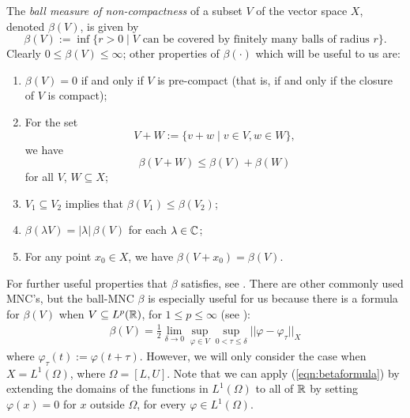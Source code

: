 \begin{definition} \label{th:betadef}
	The \emph{ball measure of non-compactness} of a subset $V$ of the vector space $X$, denoted $\beta(V)$, is given by
	\[\beta(V):= \inf\{ r>0 \mid V \text{ can be covered by finitely many balls of radius } r \}.\]
	Clearly $0 \leq \beta(V) \leq \infty$; other properties of $\beta(\cdot)$ which will be useful to us are:
	\begin{enumerate}
		\item $\beta(V) = 0$ if and only if $V$ is pre-compact (that is, if and only if the closure of $V$ is compact);
		\item For the set
		\[V + W := \{v + w \mid v \in V, w \in W\},\]
		we have
		\[\beta(V+W) \leq \beta(V) + \beta(W)\]
		for all $V$, $W \subseteq X$;
		\item $V_1 \subseteq V_2$ implies that $\beta(V_1) \leq \beta(V_2)$;
		\item $\beta(\lambda V) = |\lambda| \, \beta(V)$ for each $\lambda \in \mathbb{C}$;
		\item For any point $x_0 \in X$, we have $\beta(V+x_0) = \beta(V)$.
	\end{enumerate}
\end{definition}
For further useful properties that $\beta$ satisfies, see \cite{Akhmerov1992}. There are other commonly used MNC's, but the ball-MNC $\beta$ is especially useful for us because there is a formula for $\beta(V)$ when $V \subseteq L^p(\mathbb{R})$, for $1 \leq p \leq \infty$ (see \cite{Akhmerov1992}):
\begin{align}
	\beta(V) = \frac 12 \lim_{\delta \to 0} \sup_{\varphi \in V} \sup_{0<\tau \leq \delta} ||\varphi - \varphi_\tau||_X \label{eqn:betaformula}
\end{align}
where $\varphi_\tau(t) := \varphi(t + \tau)$. However, we will only consider the case when $X = L^1(\Omega)$, where $\Omega = [L, U]$. Note that we can apply (\ref{eqn:betaformula}) by extending the domains of the functions in $L^1(\Omega)$ to all of $\mathbb{R}$ by setting $\varphi(x) = 0$ for $x$ outside $\Omega$, for every $\varphi \in L^1(\Omega)$.

